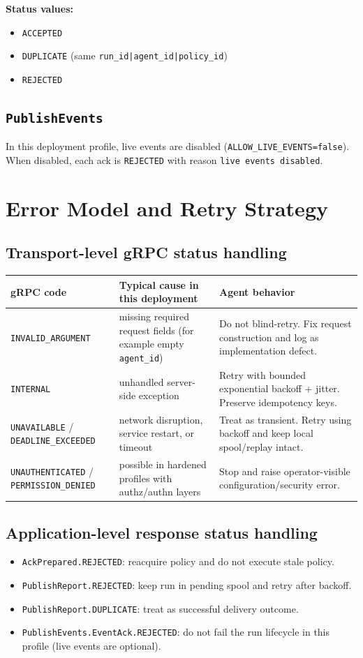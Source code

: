\documentclass[11pt,a4paper]{article}
\begin{document}
\textbf{Status values:}
\begin{itemize}
  \item \texttt{ACCEPTED}
  \item \texttt{DUPLICATE} (same \texttt{run\_id|agent\_id|policy\_id})
  \item \texttt{REJECTED}
\end{itemize}

\subsection{\texttt{PublishEvents}}
In this deployment profile, live events are disabled (\texttt{ALLOW\_LIVE\_EVENTS=false}).
When disabled, each ack is \texttt{REJECTED} with reason \texttt{live events disabled}.

\section{Error Model and Retry Strategy}
\subsection{Transport-level gRPC status handling}
\begin{longtable}{p{3.4cm}p{5.0cm}p{4.8cm}}
\textbf{gRPC code} & \textbf{Typical cause in this deployment} & \textbf{Agent behavior} \\
\hline
\endhead
\texttt{INVALID\_ARGUMENT} & missing required request fields (for example empty \texttt{agent\_id}) &
Do not blind-retry. Fix request construction and log as implementation defect. \\
\texttt{INTERNAL} & unhandled server-side exception &
Retry with bounded exponential backoff + jitter. Preserve idempotency keys. \\
\texttt{UNAVAILABLE} / \texttt{DEADLINE\_EXCEEDED} &
network disruption, service restart, or timeout &
Treat as transient. Retry using backoff and keep local spool/replay intact. \\
\texttt{UNAUTHENTICATED} / \texttt{PERMISSION\_DENIED} &
possible in hardened profiles with authz/authn layers &
Stop and raise operator-visible configuration/security error. \\
\hline
\end{longtable}

\subsection{Application-level response status handling}
\begin{itemize}
  \item \texttt{AckPrepared.REJECTED}: reacquire policy and do not execute stale policy.
  \item \texttt{PublishReport.REJECTED}: keep run in pending spool and retry after backoff.
  \item \texttt{PublishReport.DUPLICATE}: treat as successful delivery outcome.
  \item \texttt{PublishEvents.EventAck.REJECTED}: do not fail the run lifecycle in this profile (live events are optional).
\end{itemize}
\end{document}
